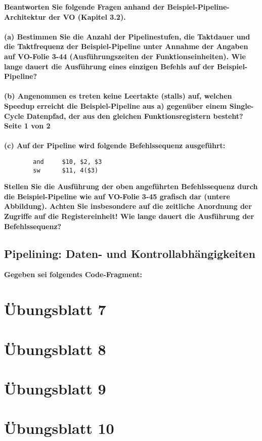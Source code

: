 \documentclass[11pt]{article}
\begin{document}
    \textbf{Beantworten Sie folgende Fragen anhand der Beispiel-Pipeline-Architektur der VO (Kapitel 3.2).\\\\
    (a) Bestimmen Sie die Anzahl der Pipelinestufen, die Taktdauer und die Taktfrequenz der
    Beispiel-Pipeline unter Annahme der Angaben auf VO-Folie 3-44 (Ausführungszeiten der
    Funktionseinheiten). Wie lange dauert die Ausführung eines einzigen Befehls auf der
    Beispiel-Pipeline?\\\\
    (b) Angenommen es treten keine Leertakte (stalls) auf, welchen Speedup erreicht die
    Beispiel-Pipeline aus a) gegenüber einem Single-Cycle Datenpfad, der aus den gleichen
    Funktionsregistern besteht?\\
    Seite 1 von 2\\\\
    (c) Auf der Pipeline wird folgende Befehlssequenz ausgeführt:\\}
    \begin{verbatim}
        and     $10, $2, $3
        sw      $11, 4($3)
    \end{verbatim}

    \textbf{    Stellen Sie die Ausführung der oben angeführten Befehlssequenz durch die Beispiel-Pipeline
    wie auf VO-Folie 3-45 grafisch dar (untere Abbildung). Achten Sie insbesondere auf die
    zeitliche Anordnung der Zugriffe auf die Registereinheit! Wie lange dauert die Ausführung der
    Befehlssequenz?}


    \subsection{Pipelining: Daten- und Kontrollabhängigkeiten}
    \textbf{Gegeben sei folgendes Code-Fragment:}

    \begin{center}
        
    
    \end{center}




\section{Übungsblatt 7}


\section{Übungsblatt 8}



\section{Übungsblatt 9}


\section{Übungsblatt 10}

    
\end{document}
